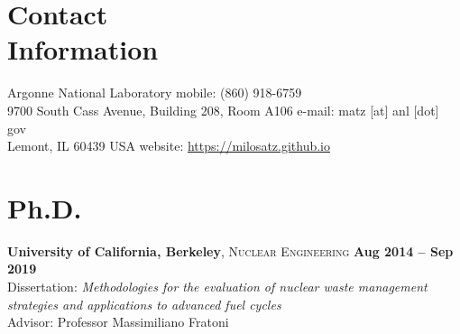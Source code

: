 \documentclass[margin,line]{resume}
\begin{document}
\begin{resume}
\section{\mysidestyle Contact\\Information}
    Argonne National Laboratory
        \hfill mobile: (860) 918-6759 \\
    9700 South Cass Avenue, Building 208, Room A106
        \hfill e-mail: matz [at] anl [dot] gov \\
    Lemont, IL 60439 USA
        \hfill website: \url{https://milosatz.github.io}\\
    
%
%
%
%

\section{\mysidestyle Ph.D.}
    \textbf{University of California, Berkeley}, 
    \textsc{Nuclear Engineering} \hfill 
    \textbf{Aug 2014 -- Sep 2019} \vspace{1mm} \\
    Dissertation: \textsl{Methodologies for the evaluation of nuclear waste management strategies and applications to advanced fuel cycles} \\
    Advisor: Professor Massimiliano Fratoni


\end{resume}
\end{document}

